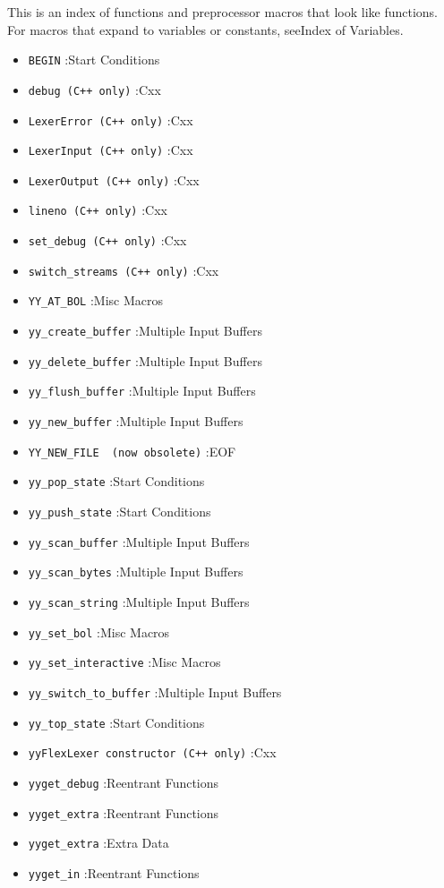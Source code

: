 \documentclass[openany,oneside]{book}
\begin{document}
This is an index of functions and preprocessor macros that look like functions. 
For macros that expand to variables or constants, seeIndex of Variables.
\begin{itemize}
\item  \verb`BEGIN` :Start Conditions
\item  \verb`debug (C++ only)` :Cxx
\item  \verb`LexerError (C++ only)` :Cxx
\item  \verb`LexerInput (C++ only)` :Cxx
\item  \verb`LexerOutput (C++ only)` :Cxx
\item  \verb`lineno (C++ only)` :Cxx
\item  \verb`set_debug (C++ only)` :Cxx
\item  \verb`switch_streams (C++ only)` :Cxx
\item  \verb`YY_AT_BOL` :Misc Macros
\item  \verb`yy_create_buffer` :Multiple Input Buffers
\item  \verb`yy_delete_buffer` :Multiple Input Buffers
\item  \verb`yy_flush_buffer` :Multiple Input Buffers
\item  \verb`yy_new_buffer` :Multiple Input Buffers
\item  \verb`YY_NEW_FILE  (now obsolete)` :EOF
\item  \verb`yy_pop_state` :Start Conditions
\item  \verb`yy_push_state` :Start Conditions
\item  \verb`yy_scan_buffer` :Multiple Input Buffers
\item  \verb`yy_scan_bytes` :Multiple Input Buffers
\item  \verb`yy_scan_string` :Multiple Input Buffers
\item  \verb`yy_set_bol` :Misc Macros
\item  \verb`yy_set_interactive` :Misc Macros
\item  \verb`yy_switch_to_buffer` :Multiple Input Buffers
\item  \verb`yy_top_state` :Start Conditions
\item  \verb`yyFlexLexer constructor (C++ only)` :Cxx
\item  \verb`yyget_debug` :Reentrant Functions
\item  \verb`yyget_extra` :Reentrant Functions
\item  \verb`yyget_extra` :Extra Data
\item  \verb`yyget_in` :Reentrant Functions

\end{itemize}
\end{document}
